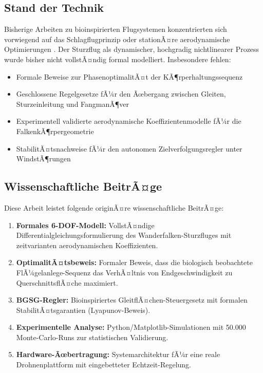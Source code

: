 ﻿\documentclass[12pt,a4paper]{article}
\theoremstyle{remark}
\begin{document}
	\subsection{Stand der Technik}
	
	Bisherige Arbeiten zu bioinspirierten Flugsystemen konzentrierten sich vorwiegend auf das Schlagflugprinzip \cite{bio1} oder stationÃ¤re aerodynamische Optimierungen \cite{aero1}. Der Sturzflug als dynamischer, hochgradig nichtlinearer Prozess wurde bisher nicht vollstÃ¤ndig formal modelliert. Insbesondere fehlen:
	
	\begin{itemize}
		\item Formale Beweise zur PhasenoptimalitÃ¤t der KÃ¶rperhaltungssequenz
		\item Geschlossene Regelgesetze fÃ¼r den Ãœbergang zwischen Gleiten, Sturzeinleitung und FangmanÃ¶ver
		\item Experimentell validierte aerodynamische Koeffizientenmodelle fÃ¼r die FalkenkÃ¶rpergeometrie
		\item StabilitÃ¤tsnachweise fÃ¼r den autonomen Zielverfolgungsregler unter WindstÃ¶rungen
	\end{itemize}
	
	\subsection{Wissenschaftliche BeitrÃ¤ge}
	
	Diese Arbeit leistet folgende originÃ¤re wissenschaftliche BeitrÃ¤ge:
	
	\begin{enumerate}
		\item \textbf{Formales 6-DOF-Modell:} VollstÃ¤ndige Differentialgleichungsformulierung des Wanderfalken-Sturzfluges mit zeitvarianten aerodynamischen Koeffizienten.
		\item \textbf{OptimalitÃ¤tsbeweis:} Formaler Beweis, dass die biologisch beobachtete FlÃ¼gelanlege-Sequenz das VerhÃ¤ltnis von Endgeschwindigkeit zu QuerschnittsflÃ¤che maximiert.
		\item \textbf{BGSG-Regler:} Bioinspiriertes GleitflÃ¤chen-Steuergesetz mit formalen StabilitÃ¤tsgarantien (Lyapunov-Beweis).
		\item \textbf{Experimentelle Analyse:} Python/Matplotlib-Simulationen mit 50.000 Monte-Carlo-Runs zur statistischen Validierung.
		\item \textbf{Hardware-Ãœbertragung:} Systemarchitektur fÃ¼r eine reale Drohnenplattform mit eingebetteter Echtzeit-Regelung.
	\end{enumerate}
	
\end{document}
